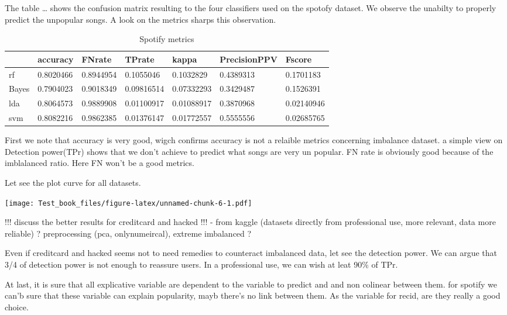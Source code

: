 \documentclass[
]{report}
\begin{document}
The table \ldots{} shows the confusion matrix resulting to the four classifiers used on the spotofy dataset. We observe the unabilty to properly predict the unpopular songs. A look on the metrics sharps this observation.

\begin{table}

\caption{\label{tab:unnamed-chunk-5}Spotify metrics}
\centering
\begin{tabular}[t]{l|l|l|l|l|l|l}
\hline
  & accuracy & FNrate & TPrate & kappa & PrecisionPPV & Fscore\\
\hline
rf & 0.8020466 & 0.8944954 & 0.1055046 & 0.1032829 & 0.4389313 & 0.1701183\\
\hline
Bayes & 0.7904023 & 0.9018349 & 0.09816514 & 0.07332293 & 0.3429487 & 0.1526391\\
\hline
lda & 0.8064573 & 0.9889908 & 0.01100917 & 0.01088917 & 0.3870968 & 0.02140946\\
\hline
svm & 0.8082216 & 0.9862385 & 0.01376147 & 0.01772557 & 0.5555556 & 0.02685765\\
\hline
\end{tabular}
\end{table}

First we note that accuracy is very good, wigch confirms accuracy is not a relaible metrics concerning imbalance dataset. a simple view on Detection power(TPr) shows that we don't achieve to predict what songs are very un popular. FN rate is obviously good because of the imblalanced ratio. Here FN won't be a good metrics.

Let see the plot curve for all datasets.

\texttt{[image: Test\_book\_files/figure-latex/unnamed-chunk-6-1.pdf]}

!!! discuss the better results for creditcard and hacked !!!
- from kaggle (datasets directly from professional use, more relevant, data more reliable) ? preprocessing (pca, onlynumeircal), extreme imbalanced ?

Even if creditcard and hacked seems not to need remedies to counteract imbalanced data, let see the detection power. We can argue that 3/4 of detection power is not enough to reassure users. In a professional use, we can wish at leat 90\% of TPr.

At last, it is sure that all explicative variable are dependent to the variable to predict and and non colinear between them. for spotify we can'b sure that these variable can explain popularity, mayb there's no link between them. As the variable for recid, are they really a good choice.
\end{document}
